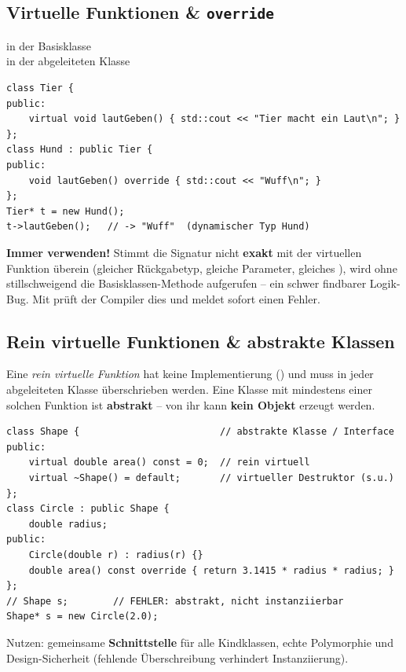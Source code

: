 \subsection{Virtuelle Funktionen \& \texttt{override}}
\begin{syntaxbox}
 \quad in der Basisklasse \\
 \quad in der abgeleiteten Klasse
\end{syntaxbox}
\begin{lstlisting}
class Tier {
public:
    virtual void lautGeben() { std::cout << "Tier macht ein Laut\n"; }
};
class Hund : public Tier {
public:
    void lautGeben() override { std::cout << "Wuff\n"; }
};
Tier* t = new Hund();
t->lautGeben();   // -> "Wuff"  (dynamischer Typ Hund)
\end{lstlisting}
\begin{merke}
\textbf{Immer  verwenden!} Stimmt die Signatur nicht \textbf{exakt} mit der virtuellen Funktion \"uberein (gleicher R\"uckgabetyp, gleiche Parameter, gleiches ), wird ohne  stillschweigend die Basisklassen-Methode aufgerufen -- ein schwer findbarer Logik-Bug. Mit  pr\"uft der Compiler dies und meldet sofort einen Fehler.
\end{merke}

\subsection{Rein virtuelle Funktionen \& abstrakte Klassen}
Eine \emph{rein virtuelle Funktion} hat keine Implementierung () und muss in jeder abgeleiteten Klasse \"uberschrieben werden. Eine Klasse mit mindestens einer solchen Funktion ist \textbf{abstrakt} -- von ihr kann \textbf{kein Objekt} erzeugt werden.
\begin{lstlisting}
class Shape {                         // abstrakte Klasse / Interface
public:
    virtual double area() const = 0;  // rein virtuell
    virtual ~Shape() = default;       // virtueller Destruktor (s.u.)
};
class Circle : public Shape {
    double radius;
public:
    Circle(double r) : radius(r) {}
    double area() const override { return 3.1415 * radius * radius; }
};
// Shape s;        // FEHLER: abstrakt, nicht instanziierbar
Shape* s = new Circle(2.0);
\end{lstlisting}
Nutzen: gemeinsame \textbf{Schnittstelle} f\"ur alle Kindklassen, echte Polymorphie und Design-Sicherheit (fehlende \"Uberschreibung verhindert Instanziierung).


